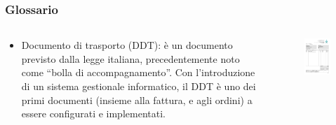 \documentclass[]{beamer}
\begin{document}
\begin{frame}
\frametitle{Glossario}
\begin{columns}
  \begin{column}{.55\textwidth}
    \begin{itemize}
      \item \alert{Documento di trasporto (DDT):}  è un documento previsto dalla legge italiana, precedentemente noto come ``bolla di accompagnamento''. Con l'introduzione di un sistema gestionale informatico, il DDT è uno dei primi documenti (insieme alla fattura, e agli ordini) a essere configurati e implementati.
    \end{itemize}
  \end{column}
  \begin{column}{.5\textwidth}
    \begin{figure}
      \includegraphics[width=\columnwidth]{img/ddt.png}
    \end{figure}
  \end{column}
\end{columns}
\end{frame}
\end{document}
